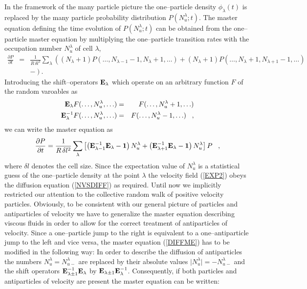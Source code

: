In the framework of the many particle picture the one--particle
density
$\phi_{\lambda}(t)$ is replaced by the many particle probability
distribution $P(N_u^{\lambda};t)$. The master equation defining the
time evolution of $P(N_u^{\lambda};t)$ can be obtained from the
one--particle master equation by multiplying the one--particle
transition rates
with the occupation number $N_u^{\lambda}$ of cell $\lambda$,
\begin{eqnarray*}
\frac{\partial P}{\partial t} & = &    \frac{1}{R \, \delta l^2}
                                    \sum_{\lambda} \left(
          (N_{\lambda} +1) P(\ldots,N_{\lambda-1}-1, N_{\lambda}+1, \ldots) 
        + (N_{\lambda} +1) P(\ldots, N_{\lambda}+1, N_{\lambda+1} -1, \ldots) 
                                      \right. \\
                            && - \left. \right).
\end{eqnarray*}
Introducing the shift--operators ${\bf E}_{\lambda}$ which operate on an
arbitrary function $F$ of the random varoables as 
\begin{eqnarray}
{\bf{E}}_{\lambda} F(\ldots, N_u^{\lambda}, \ldots)  & = &
 F(\ldots, N_u^{\lambda} + 1, \ldots)                   \nonumber \\
{\bf{E}}_{\lambda}^{-1} F(\ldots, N_u^{\lambda}, \ldots) & = &
 F(\ldots, N_u^{\lambda} - 1, \ldots)  \;\;\; ,
\end{eqnarray}
we can write the master equation as
\begin{equation}
\label{DIFFME}
\frac{\partial P}{\partial t} =    \frac{1}{R \, \delta l^2}
\sum_{\lambda} \left[ \left( {\bf{E}}_{\lambda -1}^{-1}
     {\bf{E}}_{\lambda}
     - {\bf{1}} \right) N_u^{\lambda}
     + \left( {\bf{E}}_{\lambda +1}^{-1} {\bf{E}}_{\lambda}
     - {\bf{1}} \right) N_u^{\lambda} \right] P  \;\;\; ,
\end{equation}
where $\delta l$ denotes the cell size.
Since the expectation value of $N_u^{\lambda}$ is a statistical
guess of the
one--particle density at the point $\lambda$
the velocity field (\ref{EXP2})
obeys the diffusion equation (\ref{NVSDIFF}) as required.
Until now we implicitly restricted our attention to the collective
random walk of positive velocity particles. Obviously, to be
consistent
with our general picture of particles and antiparticles of velocity
we have to generalize the master equation describing viscous fluids
in order
to allow for the correct treatment of antiparticles of velocity.
Since a one--particle jump to the right is equivalent to a
one--antiparticle
jump to the left and vice versa, the master equation (\ref{DIFFME})
has to
be modified in the following way: In order to describe the
diffusion of
antiparticles the numbers $N_u^{\lambda} = N_{u-}^{\lambda}$
are replaced
by their absolute values $\mid N_u^{\lambda} \mid =
- N_{u-}^{\lambda}$
and the shift operators 
${\bf{E}}_{\lambda \pm 1}^{-1} {\bf{E}}_{\lambda}$ by
${\bf{E}}_{\lambda \pm 1} {\bf{E}}_{\lambda}^{-1}$.
Consequently, if both particles and antiparticles of velocity
are present
the master equation can be written:

